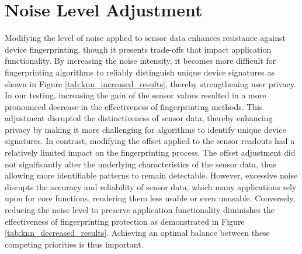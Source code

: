 \documentclass[11pt,
  oneside,openany,    %
]{scrreprt}
\begin{document}
\section{Noise Level Adjustment}
\label{sec:noise_level_adjustment}
Modifying the level of noise applied to sensor data enhances resistance against device fingerprinting, though it presents trade-offs that impact application functionality.
By increasing the noise intensity, it becomes more difficult for fingerprinting algorithms to reliably distinguish unique device signatures as shown in Figure \ref{tab:knn_increased_results}, thereby strengthening user privacy.
In our testing, increasing the gain of the sensor values resulted in a more pronounced decrease in the effectiveness of fingerprinting methods.
This adjustment disrupted the distinctiveness of sensor data, thereby enhancing privacy by making it more challenging for algorithms to identify unique device signatures.
In contrast, modifying the offset applied to the sensor readouts had a relatively limited impact on the fingerprinting process.
The offset adjustment did not significantly alter the underlying characteristics of the sensor data, thus allowing more identifiable patterns to remain detectable. 
However, excessive noise disrupts the accuracy and reliability of sensor data, which many applications rely upon for core functions, rendering them less usable or even unusable.
Conversely, reducing the noise level to preserve application functionality diminishes the effectiveness of fingerprinting protection as demonstrated in Figure \ref{tab:knn_decreased_results}.
Achieving an optimal balance between these competing priorities is thus important.
\end{document}
